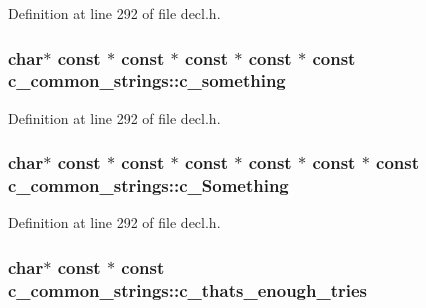 Definition at line 292 of file decl.\+h.

\hypertarget{structc__common__strings_aaa42324e73916106c283c3c6631ae46e}{
\subsubsection[{c\+\_\+something}]{ char$\ast$ {\bf const} $\ast$ {\bf const} $\ast$ {\bf const} $\ast$ {\bf const} $\ast$ {\bf const} c\+\_\+common\+\_\+strings\+::c\+\_\+something}}\label{structc__common__strings_aaa42324e73916106c283c3c6631ae46e}


Definition at line 292 of file decl.\+h.

\hypertarget{structc__common__strings_a12fac4dea70d4196131dc364bf9a31c2}{
\subsubsection[{c\+\_\+\+Something}]{ char$\ast$ {\bf const} $\ast$ {\bf const} $\ast$ {\bf const} $\ast$ {\bf const} $\ast$ {\bf const} $\ast$ {\bf const} c\+\_\+common\+\_\+strings\+::c\+\_\+\+Something}}\label{structc__common__strings_a12fac4dea70d4196131dc364bf9a31c2}


Definition at line 292 of file decl.\+h.

\hypertarget{structc__common__strings_a336294d5330f301bc2eddd71bd9059e9}{
\subsubsection[{c\+\_\+thats\+\_\+enough\+\_\+tries}]{ char$\ast$ {\bf const} $\ast$ {\bf const} c\+\_\+common\+\_\+strings\+::c\+\_\+thats\+\_\+enough\+\_\+tries}}\label{structc__common__strings_a336294d5330f301bc2eddd71bd9059e9}



